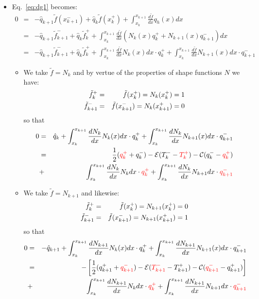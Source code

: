 \begin{itemize}
\item Eq.~\ref{eq:dg1} becomes:
\begin{eqnarray}
0 &=&
-\hat{q}_{k+1} \tilde{f}(x_{k+1}^-)
+\hat{q}_k     \tilde{f}(x_k^+)
+ \int_{x_k}^{x_{k+1}} \frac{d\tilde{f}}{dx} q_h(x) dx  \nonumber\\
&=&-\hat{q}_{k+1} \tilde{f}_{k+1}^-
+\hat{q}_k     \tilde{f}_k^+
+ \int_{x_k}^{x_{k+1}} \frac{d\tilde{f}}{dx} ( N_k(x) q_k^+ + N_{k+1}(x)q_{k+1}^- ) dx \nonumber\\
&=& -\hat{q}_{k+1} \tilde{f}_{k+1}^-
+\hat{q}_k     \tilde{f}_k^+
+ \int_{x_k}^{x_{k+1}} \frac{d\tilde{f}}{dx} N_k(x) dx \cdot q_k^+ 
+ \int_{x_k}^{x_{k+1}} \frac{d\tilde{f}}{dx} N_{k+1}(x) dx \cdot q_{k+1}^- 
\end{eqnarray}

\begin{itemize}
\item We take $\tilde{f}=N_k$ and by vertue of the properties of shape functions $N$ we have: 
\begin{eqnarray}
\tilde{f}_k^+&=&\tilde{f}(x_k^+) = N_k(x_k^+)=1 \nonumber\\
\tilde{f}_{k+1}^-&=&\tilde{f}(x_{k+1}^-)   = N_k(x_{k+1}^+)=0 \nonumber
\end{eqnarray}
so that 
\begin{eqnarray}
0 
&=& \hat{q}_k   
+ \int_{x_k}^{x_{k+1}} \frac{dN_k}{dx} N_k(x) dx \cdot q_k^+ 
+ \int_{x_k}^{x_{k+1}} \frac{dN_k}{dx} N_{k+1}(x) dx \cdot q_{k+1}^- \nonumber\\ 
&=& 
\frac{1}{2}({\color{red}q_k^+} + q_k^-) - {\cal E} (T_k^- - {\color{red}T_k^+}) 
- {\cal C}(q_k^- - {\color{red}q_k^+}) \nonumber\\
&+& \int_{x_k}^{x_{k+1}} \frac{dN_k}{dx} N_k dx \cdot {\color{red}q_k^+ }
+ \int_{x_k}^{x_{k+1}} \frac{dN_k}{dx} N_{k+1} dx \cdot {\color{red} q_{k+1}^-}
\end{eqnarray}

\item We take $\tilde{f}=N_{k+1}$ and likewise:
\begin{eqnarray}
\tilde{f}_k^+&=&\tilde{f}(x_k^+) = N_{k+1}(x_k^+)=0 \nonumber\\
\tilde{f}_{k+1}^-&=&\tilde{f}(x_{k+1}^-)   = N_{k+1}(x_{k+1}^+)=1 \nonumber
\end{eqnarray}
so that 
\begin{eqnarray}
0 
&=& -\hat{q}_{k+1} 
+ \int_{x_k}^{x_{k+1}} \frac{dN_{k+1}}{dx} N_k(x) dx \cdot q_k^+ 
+ \int_{x_k}^{x_{k+1}} \frac{dN_{k+1}}{dx} N_{k+1}(x) dx \cdot q_{k+1}^- \nonumber\\ 
&=& - \left[
\frac{1}{2}(q_{k+1}^+ + {\color{red}q_{k+1}^-}) - {\cal E} ({\color{red}T_{k+1}^-} 
- T_{k+1}^+) -{\cal C}({\color{red}q_{k+1}^-} - q_{k+1}^+) 
\right]\nonumber\\
&+& \int_{x_k}^{x_{k+1}} \frac{dN_{k+1}}{dx} N_k dx \cdot {\color{red}q_k^+} 
+ \int_{x_k}^{x_{k+1}} \frac{dN_{k+1}}{dx} N_{k+1}dx \cdot {\color{red}q_{k+1}^-} 
\end{eqnarray}




\end{itemize}
\end{itemize}
